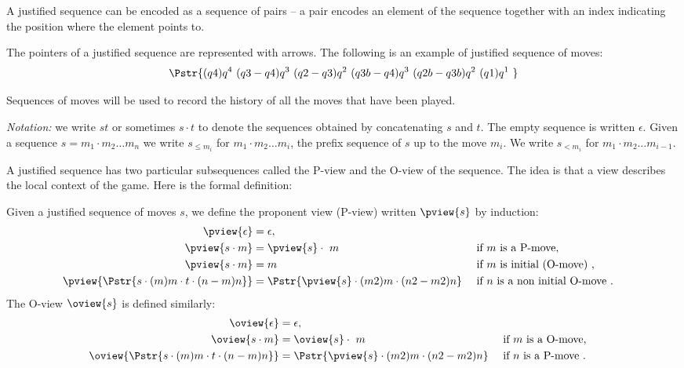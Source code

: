 A justified sequence can be encoded as a sequence of pairs -- a pair
encodes an element of the sequence together with an index indicating
the position where the element points to.

The pointers of a justified sequence are represented with arrows.
The following is an example of justified sequence of moves:
$$\Pstr{ (q4){q^4}\ (q3-q4){q^3}\  (q2-q3){q^2}\ (q3b-q4){q^3}\ (q2b-q3b){q^2}\ (q1){q^1}\
}$$

Sequences of moves will be used to record the history of all the
moves that have been played.


\vspace{18pt} \emph{Notation:} we write $s t$ or sometimes $s \cdot
t$ to denote the sequences obtained by concatenating $s$ and $t$.
The empty sequence is written $\epsilon$. Given a sequence $s = m_1
\cdot m_2 \ldots m_n$ we write $s_{\leq m_i}$ for $m_1 \cdot m_2
\ldots m_i$, the prefix sequence of $s$ up to the move $m_i$. We
write $s_{< m_i}$ for $m_1 \cdot m_2 \ldots m_{i-1}$.


A justified sequence has two particular subsequences called the P-view and the O-view
of the sequence. The idea is that a view describes the local context
of the game. Here is the formal definition:
\begin{definition}[View]
Given a justified sequence of moves $s$, we define the proponent view (P-view) written $\pview{s}$ by induction:
\begin{align*}
\pview{\epsilon} &= \epsilon, \\
\pview{s \cdot m} &= \pview{s} \cdot \ m && \mbox{ if $m$ is a P-move}, \\
\pview{s \cdot m} &= m && \mbox{ if $m$ is initial (O-move) }, \\
\pview{ \Pstr{ s \cdot (m){m} \cdot t \cdot (n-m){n}} } &=
     \Pstr{ \pview{s} \cdot (m2){m} \cdot (n2-m2){n}} && \mbox{ if $n$ is a non initial O-move
 }.
\end{align*}
The O-view $\oview{s}$ is defined similarly:
\begin{align*}
\oview{\epsilon} &= \epsilon, \\
\oview{s \cdot m} &= \oview{s} \cdot \ m && \mbox{ if $m$ is a O-move}, \\
\oview{ \Pstr{ s \cdot (m){m} \cdot t \cdot (n-m){n} } } &=
\Pstr{ \pview{s} \cdot (m2){m} \cdot (n2-m2){n} } && \mbox{ if $n$ is a P-move
 }.
\end{align*}
\end{definition}


